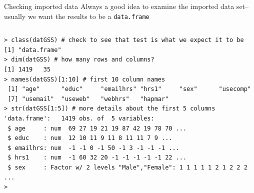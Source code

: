 \documentclass[table,smaller]{beamer}
\begin{document}
\begin{frame}[fragile,label=sec-5-4]{Checking imported data}
 Always a good idea  to examine the imported data set--usually we want the results to be a \verb~data.frame~
\vspace{-.5em}
\begin{columns}
\begin{block}{}
\begin{verbatim}
> class(datGSS) # check to see that test is what we expect it to be
[1] "data.frame"
> dim(datGSS) # how many rows and columns?
[1] 1419   35
> names(datGSS)[1:10] # first 10 column names
 [1] "age"      "educ"     "emailhrs" "hrs1"     "sex"      "usecomp" 
 [7] "usemail"  "useweb"   "webhrs"   "hapmar"  
> str(datGSS[1:5]) # more details about the first 5 columns
'data.frame':	1419 obs. of  5 variables:
 $ age     : num  69 27 19 21 19 87 42 19 78 70 ...
 $ educ    : num  12 10 11 9 11 8 11 11 7 9 ...
 $ emailhrs: num  -1 -1 0 -1 50 -1 3 -1 -1 -1 ...
 $ hrs1    : num  -1 60 32 20 -1 -1 -1 -1 -1 22 ...
 $ sex     : Factor w/ 2 levels "Male","Female": 1 1 1 1 1 2 1 2 2 2 ...
>
\end{verbatim}
\end{block}
\end{columns}
\vspace{.5em}
\end{frame}
\end{document}
